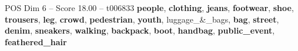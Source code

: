 \begin{textsample}{POS Dim 6 – Score 18.00 – t006833}  \label{ex:f6_pos_009}
\textbf{people}, \textbf{clothing}, \textbf{jeans}, \textbf{footwear}, \textbf{shoe}, \textbf{trousers}, \textbf{leg}, \textbf{crowd}, \textbf{pedestrian}, \textbf{youth}, luggage\_\&\_bags, \textbf{bag}, \textbf{street}, \textbf{denim}, \textbf{sneakers}, \textbf{walking}, \textbf{backpack}, \textbf{boot}, \textbf{handbag}, \textbf{public\_event}, \textbf{feathered\_hair}

\end{textsample}
